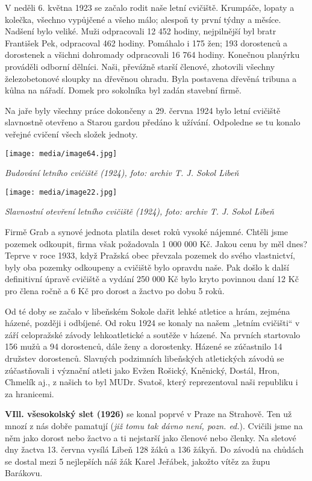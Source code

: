 V neděli 6. května 1923 se začalo rodit naše letní cvičiště. Krumpáče,
lopaty a kolečka, všechno vypůjčené a všeho málo; alespoň ty první týdny
a měsíce. Nadšení bylo veliké. Muži odpracovali 12 452 hodiny,
nejpilnější byl bratr František Pek, odpracoval 462 hodiny. Pomáhalo i
175 žen; 193 dorostenců a dorostenek a všichni dohromady odpracovali 16
764 hodiny. Konečnou planýrku prováděli odborní dělníci. Naši, převážně
starší členové, zhotovili všechny železobetonové sloupky na dřevěnou
ohradu. Byla postavena dřevěná tribuna a kůlna na nářadí. Domek pro
sokolníka byl zadán stavební firmě.

Na jaře byly všechny práce dokončeny a 29. června 1924 bylo letní
cvičiště slavnostně otevřeno a Starou gardou předáno k užívání.
Odpoledne se tu konalo veřejné cvičení všech složek jednoty.

\texttt{[image: media/image64.jpg]}

\emph{Budování letního cvičiště (1924), foto: archiv T. J. Sokol Libeň}

\texttt{[image: media/image22.jpg]}

\emph{Slavnostní otevření letního cvičiště (1924), foto: archiv T. J.
Sokol Libeň}

Firmě Grab a synové jednota platila deset roků vysoké nájemné. Chtěli
jsme pozemek odkoupit, firma však požadovala 1 000 000 Kč. Jakou cenu by
měl dnes? Teprve v roce 1933, když Pražská obec převzala pozemek do
svého vlastnictví, byly oba pozemky odkoupeny a cvičiště bylo opravdu
naše. Pak došlo k další definitivní úpravě cvičiště a vydání 250 000 Kč
bylo kryto povinnou daní 12 Kč pro člena ročně a 6 Kč pro dorost a
žactvo po dobu 5 roků.

Od té doby se začalo v libeňském Sokole dařit lehké atletice a hrám,
zejména házené, později i odbíjené. Od roku 1924 se konaly na našem
„letním cvičišti`` v září celopražské závody lehkoatletické a soutěže v
házené. Na prvních startovalo 156 mužů a 94 dorostenců, dále ženy a
dorostenky. Házené se zúčastnilo 14 družstev dorostenců. Slavných
podzimních libeňských atletických závodů se zúčastňovali i význační
atleti jako Evžen Rošický, Kněnický, Dostál, Hron, Chmelík aj., z našich
to byl MUDr. Svatoš, který reprezentoval naši republiku i za hranicemi.

\textbf{VIll. všesokolský slet (1926)} se konal poprvé v Praze na
Strahově. Ten už mnozí z nás dobře pamatují (\emph{již tomu tak dávno
není, pozn. ed.}). Cvičili jsme na něm jako dorost nebo žactvo a ti
nejstarší jako členové nebo členky. Na sletové dny žactva 13. června
vysílá Libeň 128 žáků a 136 žákyň. Do závodů na chůdách se dostal mezi 5
nejlepších náš žák Karel Jeřábek, jakožto vítěz za župu Barákovu.

